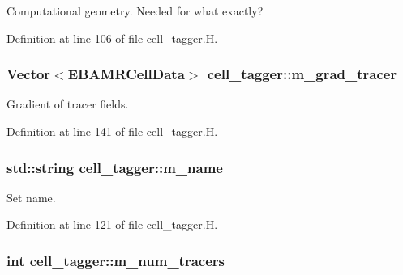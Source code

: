 Computational geometry. Needed for what exactly? 



Definition at line 106 of file cell\+\_\+tagger.\+H.

\subsubsection[{\texorpdfstring{m\+\_\+grad\+\_\+tracer}{m_grad_tracer}}]{\setlength{\rightskip}{0pt plus 5cm}Vector$<${\bf E\+B\+A\+M\+R\+Cell\+Data}$>$ cell\+\_\+tagger\+::m\+\_\+grad\+\_\+tracer\hspace{0.3cm}{\ttfamily [protected]}}\hypertarget{classcell__tagger_a8ca300677503a1e619104a5eef82c21c}{}\label{classcell__tagger_a8ca300677503a1e619104a5eef82c21c}


Gradient of tracer fields. 



Definition at line 141 of file cell\+\_\+tagger.\+H.

\subsubsection[{\texorpdfstring{m\+\_\+name}{m_name}}]{\setlength{\rightskip}{0pt plus 5cm}std\+::string cell\+\_\+tagger\+::m\+\_\+name\hspace{0.3cm}{\ttfamily [protected]}}\hypertarget{classcell__tagger_a9efdcde4e1d4bfbe8b6b59b91875efd5}{}\label{classcell__tagger_a9efdcde4e1d4bfbe8b6b59b91875efd5}


Set name. 



Definition at line 121 of file cell\+\_\+tagger.\+H.

\subsubsection[{\texorpdfstring{m\+\_\+num\+\_\+tracers}{m_num_tracers}}]{\setlength{\rightskip}{0pt plus 5cm}int cell\+\_\+tagger\+::m\+\_\+num\+\_\+tracers\hspace{0.3cm}{\ttfamily [protected]}}\hypertarget{classcell__tagger_a23a211cfbb88bf78e7d61b7df4bd53f1}{}\label{classcell__tagger_a23a211cfbb88bf78e7d61b7df4bd53f1}


